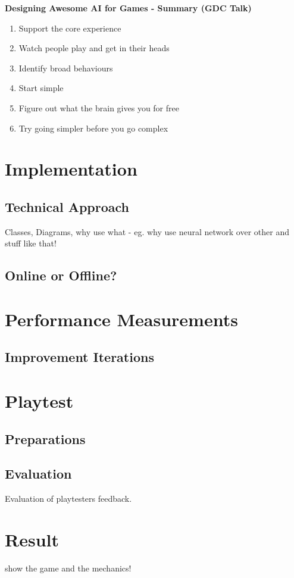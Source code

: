 \documentclass[MGS,Master,english]{twbook}%
\begin{document}
\textbf{Designing Awesome AI for Games - Summary (GDC Talk)}
\begin{enumerate}
	\item Support the core experience
	\item Watch people play and get in their heads
	\item Identify broad behaviours
	\item Start simple
	\item Figure out what the brain gives you for free
	\item Try going simpler before you go complex
\end{enumerate}

\section{Implementation}
\subsection{Technical Approach}
Classes, Diagrams, why use what - eg. why use neural network over other and stuff like that!
\subsection{Online or Offline?}
\section{Performance Measurements}
\subsection{Improvement Iterations}
\section{Playtest}
\subsection{Preparations}
\subsection{Evaluation}
Evaluation of playtesters feedback.
\section{Result}
show the game and the mechanics!

%
%
\clearpage
\end{document}
